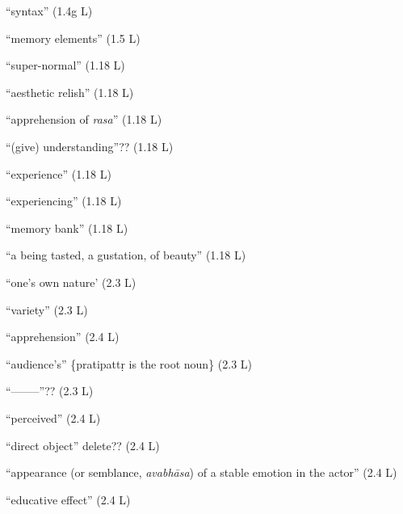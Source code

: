 \documentclass[10pt]{article}
\begin{document}
\begin{multicols}{2}
\begin{enumerate}[
			leftmargin=0em,
			rightmargin=0em,
		]
		 ``syntax'' (1.4g L)

		\litem{-------} ``memory elements'' (1.5 L)

		 ``super-normal'' (1.18 L)

		 ``aesthetic relish'' (1.18 L)

		 ``apprehension of \textit{rasa}'' (1.18 L)

		 ``(give) understanding''?? (1.18 L)

		 ``experience'' (1.18 L)

		 ``experiencing'' (1.18 L)

		 ``memory bank'' (1.18 L)

		 ``a being tasted, a gustation, of beauty'' (1.18 L)

		 ``one's own nature' (2.3 L)

		 ``variety'' (2.3 L)

		 ``apprehension'' (2.4 L)

		 ``audience's'' \{pratipattṛ is the root noun\} (2.3 L)

		 ``--------''?? (2.3 L)

		 ``perceived'' (2.4 L)

		 ``direct object'' delete?? (2.4 L)

		 ``appearance (or semblance, \textit{avabhāsa}) of a stable emotion in the actor'' (2.4 L)

		 ``educative effect'' (2.4 L)


\end{enumerate}
\end{multicols}
\end{document}
